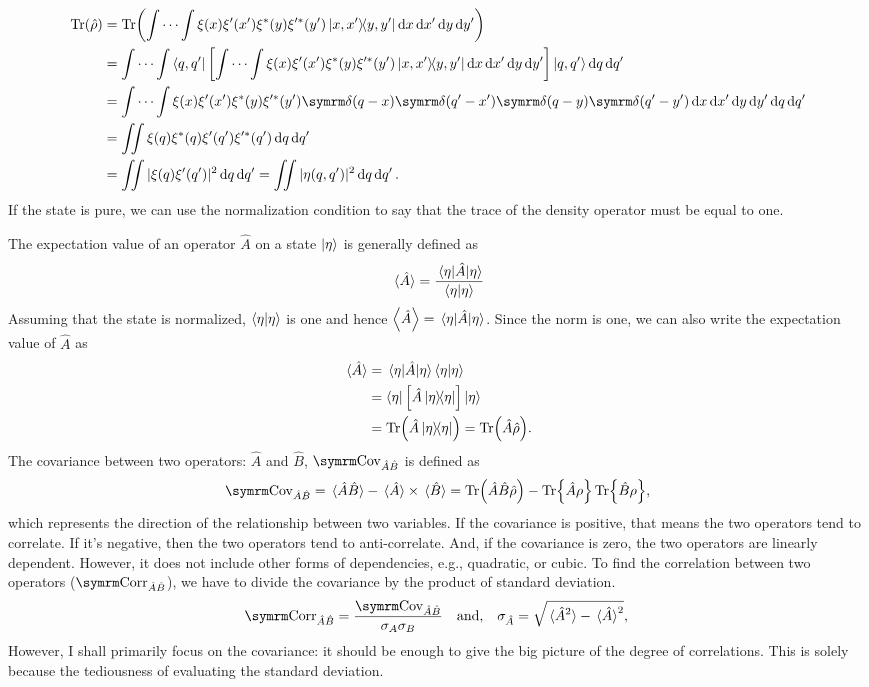 \begin{align}
    \Tr(\dnst) &= \Tr(\idotsint\xi(x)\xi'(x')\xi\conj(y)\xi^{\prime\ast}(y')\ketbra{x, x'}{y, y'}\dd{x}\dd{x'}\dd{y}\dd{y'}) \\
    &= \idotsint\bra{q, q'}\left[\idotsint\xi(x)\xi'(x')\xi\conj(y)\xi^{\prime\ast}(y')\ketbra{x, x'}{y, y'}\dd{x}\dd{x'}\dd{y}\dd{y'}\right]\ket{q, q'}\dd{q}\dd{q'} \nonumber\\
    &= \idotsint\xi(x)\xi'(x')\xi\conj(y)\xi^{\prime\ast}(y')\ddel(q - x)\ddel(q' - x')\ddel(q - y)\ddel(q' - y')\dd{x}\dd{x'}\dd{y}\dd{y'}\dd{q}\dd{q'} \nonumber \\
    &= \iint\xi(q)\xi\conj(q)\xi'(q')\xi^{\prime\ast}(q')\dd{q}\dd{q'} \\
    &= \iint|\xi(q)\xi'(q')|^2\dd{q}\dd{q'} = \iint|\eta(q, q')|^2\dd{q}\dd{q'}.
\end{align}
If the state is pure, we can use the normalization condition to say that the trace of the density operator must be equal to one.

The expectation value of an operator $\hat{A}$ on a state $\ket{\eta}$ is generally defined as
\begin{equation}
    \expval*{\hat{A}} = \frac{\mel{\eta}{\hat{A}}{\eta}}{\braket{\eta}} 
\end{equation}
Assuming that the state is normalized, $\braket{\eta}$ is one and hence $\expval{\hat{A}} = \mel{\eta}{\hat{A}}{\eta}$. Since the norm is one, we can also write the expectation value of $\hat{A}$ as
\begin{align}
    \expval*{\hat{A}} &= \mel{\eta}{\hat{A}}{\eta}\braket{\eta} \\
    &= \bra{\eta}\left[\hat{A}\ketbra{\eta}\right]\ket{\eta} \\
    &= \Tr(\hat{A}\ketbra{\eta}) = \Tr(\hat{A}\hat{\rho}).
\end{align}
The covariance between two operators: $\hat{A}$ and $\hat{B}$, $\cov_{\hat{A}\hat{B}}$ is defined as
\begin{equation}
    \cov_{\hat{A}\hat{B}} = \expval*{\hat{A}\hat{B}} - \expval*{\hat{A}}\times\expval*{\hat{B}} = \Tr(\hat{A}\hat{B}\dnst) - \Tr{\hat{A}\rho}\Tr{\hat{B}\rho},
\end{equation}
which represents the direction of the relationship between two variables. If the covariance is positive, that means the two operators tend to correlate. If it's negative, then the two operators tend to anti-correlate. And, if the covariance is zero, the two operators are linearly dependent. However, it does not include other forms of dependencies, e.g., quadratic, or cubic.
To find the correlation between two operators ($\corr_{\hat{A}\hat{B}}$), we have to divide the covariance by the product of standard deviation.
\begin{equation}
    \corr_{\hat{A}\hat{B}} = \frac{\cov_{\hat{A}\hat{B}}}{\sigma_A\sigma_B} \mathand \sigma_{\hat{A}} = \sqrt{\ev*{\hat{A}^2} - \ev*{\hat{A}}^2}, \\
\end{equation}
However, I shall primarily focus on the covariance: it should be enough to give the big picture of the degree of correlations. This is solely because the tediousness of evaluating the standard deviation.


